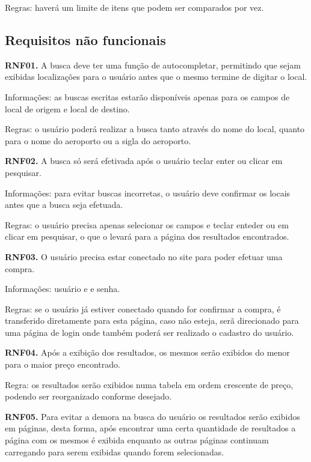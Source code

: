 \documentclass[12pt]{article}
\begin{document}
Regras: haverá um limite de itens que podem ser comparados por vez.

\subsection{Requisitos não funcionais}

{\bf RNF01.} A busca deve ter uma função de autocompletar, permitindo que sejam exibidas localizações para o usuário antes que o mesmo termine de digitar o local.

Informações: as buscas escritas estarão disponíveis apenas para os campos de local de origem e local de destino.

Regras: o usuário poderá realizar a busca tanto através do nome do local, quanto para o nome do aeroporto ou a sigla do aeroporto.


\bigskip
{\bf RNF02.} A busca só será efetivada após o usuário teclar enter ou clicar em pesquisar.

Informações: para evitar buscas incorretas, o usuário deve confirmar os locais antes que a busca seja efetuada.

Regras: o usuário precisa apenas selecionar os campos e teclar enteder ou em clicar em pesquisar, o que o levará para a página dos resultados encontrados.


\bigskip
{\bf RNF03.} O usuário precisa estar conectado no site para poder efetuar uma compra.

Informações: usuário e e senha.

Regras: se o usuário já estiver conectado quando for confirmar a compra, é transferido diretamente para esta página, caso não esteja, serã direcionado para uma página de login onde também poderá ser realizado o cadastro do usuário.


\bigskip
{\bf RNF04.} Após a exibição dos resultados, os mesmos serão exibidos do menor para o maior preço encontrado.

Regra: os resultados serão exibidos numa tabela em ordem crescente de preço, podendo ser reorganizado conforme desejado.


\bigskip
{\bf RNF05.} Para evitar a demora na busca do usuário os resultados serão exibidos em páginas, desta forma, após encontrar uma certa quantidade de resultados a página com os mesmos é exibida enquanto as outras páginas continuam carregando para serem exibidas quando forem selecionadas.

\clearpage
\end{document}
